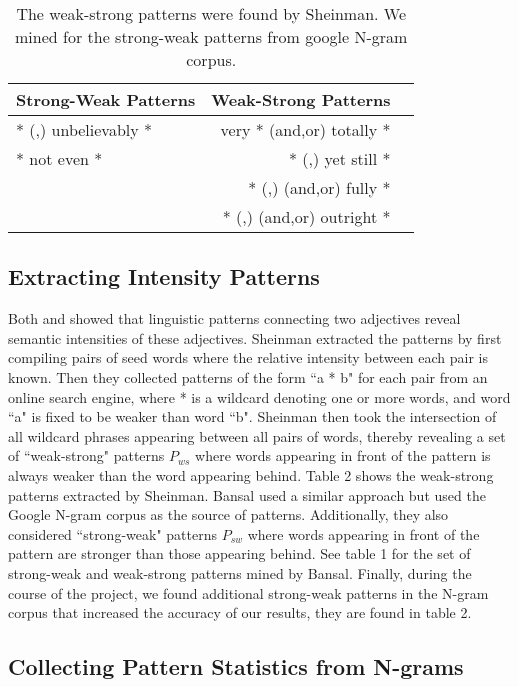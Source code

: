 \begin{table}
\small
\centering
\begin{tabular}{|l|rl|}
\hline \bf Strong-Weak Patterns & \bf Weak-Strong Patterns & \\ \hline
* (,) unbelievably *     &  very * (and,or) totally *   & \\
* not even *             &  * (,) yet still *           & \\
                         &  * (,) (and,or) fully *      & \\
                         &  * (,) (and,or) outright *   & \\
\hline
\end{tabular}
\caption{\label{font-table} The weak-strong patterns were found by Sheinman. We mined for the strong-weak patterns from google N-gram corpus.}
\end{table}

\subsection{Extracting Intensity Patterns}

Both  and  showed that linguistic patterns connecting two adjectives reveal semantic intensities of these adjectives. Sheinman extracted the patterns by first compiling pairs of seed words where the relative intensity between each pair is known.
Then they collected patterns of the form ``a * b" for each pair from an online search engine, where * is a wildcard denoting one or more words, and word ``a" is fixed to be weaker than word ``b". Sheinman then took the intersection of all wildcard phrases appearing between all pairs of words, thereby revealing a set of ``weak-strong" patterns $P_{ws}$ where words appearing in front of the pattern is always weaker than the word appearing behind. Table 2 shows the weak-strong patterns extracted by Sheinman. Bansal used a similar approach but used the Google N-gram corpus \cite{brants2006web} as the source of patterns. Additionally, they also considered ``strong-weak" patterns $P_{sw}$ where words appearing in front of the pattern are stronger than those appearing behind. See table 1 for the set of strong-weak and weak-strong patterns mined by Bansal. Finally, during the course of the project, we found additional strong-weak patterns in the N-gram corpus that increased the accuracy of our results, they are found in table 2.

\subsection{Collecting Pattern Statistics from N-grams}

